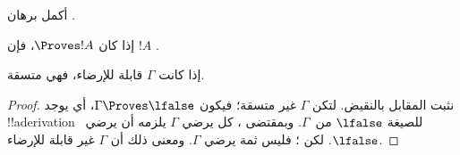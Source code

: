 \documentclass[../../../include/open-logic-section]{subfiles}
\begin{document}
\begin{prob}
  أكمل برهان .
\end{prob}
\tagendprob

\begin{cor}
إذا كان $\Proves !A$، فإن $!A$ .
\end{cor}

\begin{cor}
إذا كانت $\Gamma$ قابلة للإرضاء، فهي متسقة.
\end{cor}

\begin{proof}
نثبت المقابل بالنقيض. لتكن $\Gamma$ غير متسقة؛ فيكون
$\Gamma \Proves \lfalse$، أي يوجد !!a{derivation} للصيغة
$\lfalse$ من~$\Gamma$. وبمقتضى ، كل
يرضي $\Gamma$ يلزمه أن يرضي~$\lfalse$. لكن
؛ فليس ثمة
 يرضي $\Gamma$. ومعنى ذلك أن
$\Gamma$ غير قابلة للإرضاء.
\end{proof}
\end{document}
